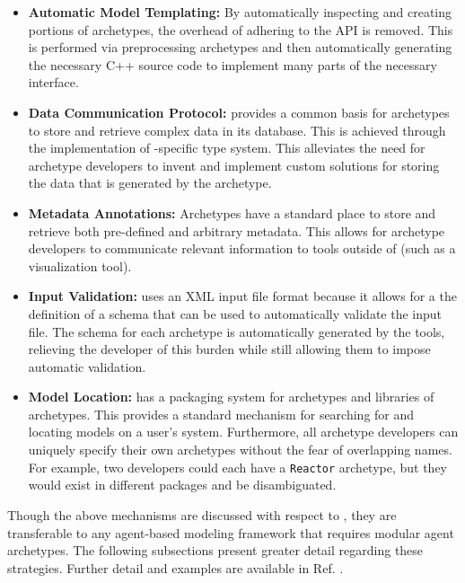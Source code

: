 \begin{itemize}
\item \textbf{Automatic Model Templating:} By automatically inspecting and
  creating portions of archetypes, the overhead of adhering to the \Cyclus
  \gls{API} is removed. This is performed via preprocessing archetypes and
  then automatically generating the necessary C++ source code to implement
  many parts of the necessary interface.

\item \textbf{Data Communication Protocol:} \Cyclus provides a common basis
  for archetypes to store and retrieve complex data in its database. This is
  achieved through the implementation of \Cyclus-specific type system.  This
  alleviates the need for archetype developers to invent and implement custom
  solutions for storing the data that is generated by the archetype.

\item \textbf{Metadata Annotations:} Archetypes have a standard place to store
  and retrieve both pre-defined and arbitrary metadata.  This allows for
  archetype developers to communicate relevant information to tools outside of
  \Cyclus (such as a visualization tool).

\item \textbf{Input Validation:} \Cyclus uses an \gls{XML} input file format
  because it allows for a the definition of a schema that can be used to
  automatically validate the input file.  The schema for each archetype is
  automatically generated by the \Cyclus tools, relieving the developer of
  this burden while still allowing them to impose automatic validation.

\item \textbf{Model Location:} \Cyclus has a packaging system for archetypes
  and libraries of archetypes. This provides a standard mechanism for
  searching for and locating models on a user's system.  Furthermore, all
  archetype developers can uniquely specify their own archetypes without the
  fear of overlapping names.  For example, two developers could each have a
  \texttt{Reactor} archetype, but they would exist in different packages and
  be disambiguated.

\end{itemize}

Though the above mechanisms are discussed with respect to \Cyclus, they are
transferable to any agent-based modeling framework that requires modular agent
archetypes. The following subsections present greater detail regarding these
strategies.  Further detail and examples are available in
Ref. .

